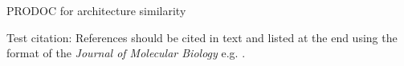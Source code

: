 PRODOC for architecture similarity

Test citation: References should be cited in text and listed at the end using the format of the \emph{Journal of Molecular Biology} e.g. \cite{pfamdb}. 


% 


